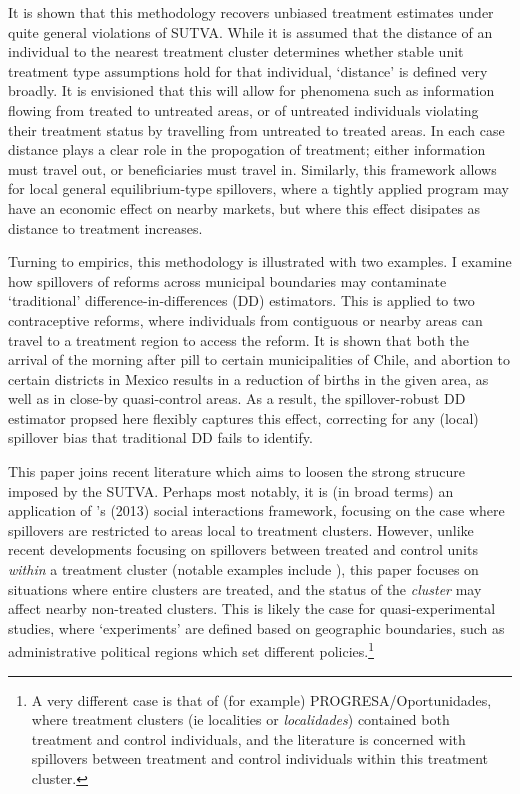 \documentclass{article}
\begin{document}
\begin{spacing}{1.1}
It is shown that this methodology recovers unbiased treatment
estimates under quite general violations of SUTVA.  While it is
assumed that the distance of an individual to the nearest treatment
cluster determines whether stable unit treatment type assumptions hold
for that individual, `distance' is defined very broadly.  It is
envisioned that this will allow for phenomena such as information
flowing from treated to untreated areas, or of untreated individuals
violating their treatment status by travelling from untreated to
treated areas.  In each case distance plays a clear role in the
propogation of treatment; either information must travel out, or
beneficiaries must travel in. Similarly, this framework allows for
local general equilibrium-type spillovers, where a tightly applied
program may have an economic effect on nearby markets, but where this
effect disipates as distance to treatment increases.

Turning to empirics, this methodology is illustrated with two examples.
I examine how spillovers of reforms across municipal boundaries may 
contaminate `traditional' difference-in-differences (DD) estimators.  This is 
applied to two contraceptive reforms, where individuals from contiguous or nearby 
areas can travel to a treatment region to access the reform.  It is shown that 
both the arrival of the morning after pill to certain municipalities of Chile, 
and abortion to certain districts in Mexico results in a reduction of births in 
the given area, as well as in close-by quasi-control areas.  As a result, the 
spillover-robust DD estimator propsed here flexibly captures this effect, 
correcting for any (local) spillover bias that traditional DD fails to 
identify.

This paper joins recent literature which aims to loosen the strong strucure 
imposed by the SUTVA.  Perhaps most notably, it is (in broad terms) an 
application of \citeauthor{Manski2013}'s (2013) social interactions framework, 
focusing on the case where spillovers are restricted to areas local to treatment 
clusters.  However, unlike recent developments focusing on spillovers 
between treated and control units \emph{within} a treatment cluster (notable
examples include \citet{McIntosh2008,Bairdetal2014,AngelucciDiMaro2010}), this 
paper focuses on situations where entire clusters are treated, and the status
of the \emph{cluster} may affect nearby non-treated clusters.  This is likely
the case for quasi-experimental studies, where `experiments' are defined based
on geographic boundaries, such as administrative political regions which set 
different policies.\footnote{A very different case is that of (for example)
PROGRESA/Oportunidades, where treatment clusters (ie localities or 
\emph{localidades}) contained both treatment and control individuals, and the
literature is concerned with spillovers between treatment and control individuals
within this treatment cluster.}


\end{spacing}
\end{document}
